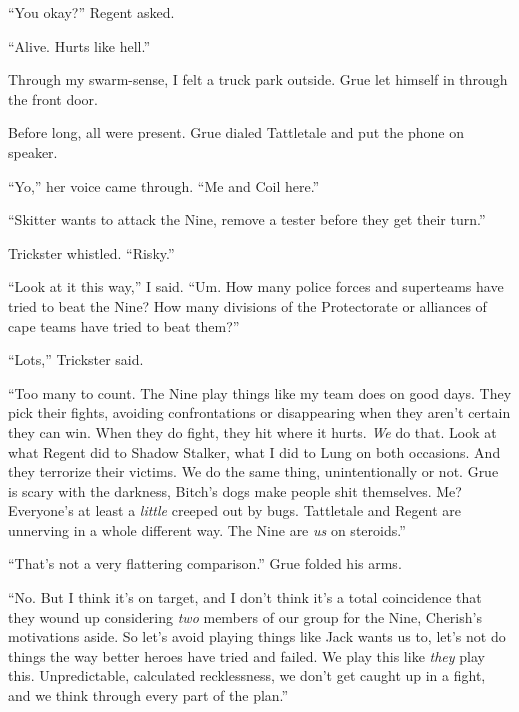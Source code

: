 ``You okay?'' Regent asked.



``Alive.  Hurts like hell.''



Through my swarm-sense, I felt a truck park outside.  Grue let himself in through the front door.



Before long, all were present.  Grue dialed Tattletale and put the phone on speaker.



``Yo,'' her voice came through.  ``Me and Coil here.''



``Skitter wants to attack the Nine, remove a tester before they get their turn.''



Trickster whistled.  ``Risky.''



``Look at it this way,'' I said.  ``Um.  How many police forces and superteams have tried to beat the Nine?  How many divisions of the Protectorate or alliances of cape teams have tried to beat them?''



``Lots,'' Trickster said.



``Too many to count.  The Nine play things like my team does on good days.  They pick their fights, avoiding confrontations or disappearing when they aren't certain they can win.  When they do fight, they hit where it hurts.  \emph{We} do that.  Look at what Regent did to Shadow Stalker, what I did to Lung on both occasions.  And they terrorize their victims.  We do the same thing, unintentionally or not.  Grue is scary with the darkness, Bitch's dogs make people shit themselves.  Me?  Everyone's at least a \emph{little} creeped out by bugs.  Tattletale and Regent are unnerving in a whole different way.  The Nine are \emph{us} on steroids.''



``That's not a very flattering comparison.''  Grue folded his arms.



``No.  But I think it's on target, and I don't think it's a total coincidence that they wound up considering \emph{two} members of our group for the Nine, Cherish's motivations aside.  So let's avoid playing things like Jack wants us to, let's not do things the way better heroes have tried and failed.  We play this like \emph{they} play this.  Unpredictable, calculated recklessness, we don't get caught up in a fight, and we think through every part of the plan.''




